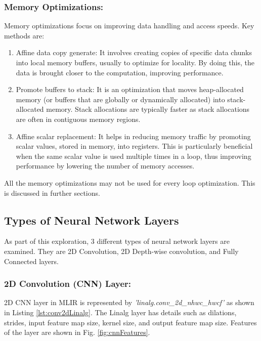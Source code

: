 \subsubsection{Memory Optimizations:}
Memory optimizations focus on improving data handling and access speeds. Key methods are: 
\begin{enumerate}  
    \item Affine data copy generate: It involves creating copies of specific data chunks into local memory buffers, usually to optimize for locality. By doing this, the data is brought closer to the computation, improving performance.
    \item Promote buffers to stack: It is an optimization that moves heap-allocated memory (or buffers that are globally or dynamically allocated) into stack-allocated memory. Stack allocations are typically faster as stack allocations are often in contiguous memory regions.
    \item Affine scalar replacement: It helps in reducing memory traffic by promoting scalar values, stored in memory, into registers. This is particularly beneficial when the same scalar value is used multiple times in a loop, thus improving performance by lowering the number of memory accesses.

\end{enumerate}

All the memory optimizations may not be used for every loop optimization. This is discussed in further sections.

\clearpage
\subsection{Types of Neural Network Layers}

As part of this exploration, 3 different types of neural network layers are examined.
They are 2D Convolution, 2D Depth-wise convolution, and Fully Connected layers.

\subsubsection{2D Convolution (CNN) Layer:}

2D CNN layer in MLIR is represented by \textit{'linalg.conv\_2d\_nhwc\_hwcf'} as shown in Listing \ref{lst:conv2dLinalg}. The Linalg layer has details such as dilations, strides, input feature map size, kernel size, and output feature map size. Features of the layer are shown in Fig. \ref{fig:cnnFeatures}.

